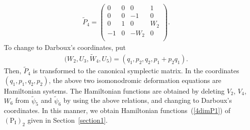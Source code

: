 \documentclass[10pt,a4paper]{amsart}
\numberwithin{equation}{section}
\begin{document}
\begin{gather*}
\widetilde{P}_4 = \left(
\begin{matrix}
0 &0 &0 &1 \\
0&0 & -1 & 0 \\
0&1 &0 & W_2 \\
-1&0 &-W_2 &0 \\
\end{matrix}
\right).
\end{gather*}
To change to Darboux's coordinates, put
\begin{gather*}
\big(W_2,U_3,\widetilde{W}_4, U_5\big) = (q_1, p_2, q_2, p_1 + p_2q_1).
\end{gather*}
Then, $\widetilde{P}_4$ is transformed to the canonical symplectic matrix. In the coordinates $(q_1, p_1, q_2, p_2)$, the above two isomonodromic deformation equations are Hamiltonian systems. The Hamiltonian functions are obtained by deleting $V_2$, $V_4$, $W_6$ from $\widetilde{\psi}_5$ and $\widetilde{\psi}_6$ by using the above relations, and changing to Darboux's coordinates. In this manner, we obtain Hamiltonian functions~(\ref{4dimP1}) of~$(\text{P}_\text{I})_2$ given in Section~\ref{section1}.
\end{document}
